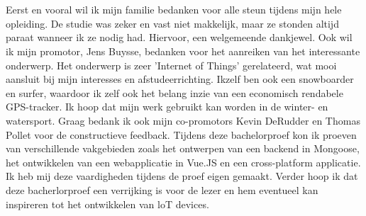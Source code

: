 
\chapter*{}
\label{ch:voorwoord}
Eerst en vooral wil ik mijn familie bedanken voor alle steun tijdens mijn hele opleiding. De studie was zeker en vast niet makkelijk, maar ze stonden altijd paraat wanneer ik ze nodig had. Hiervoor, een welgemeende dankjewel.
\newline
\newline
Ook wil ik mijn promotor, Jens Buysse, bedanken voor het aanreiken van het interessante onderwerp. Het onderwerp is zeer 'Internet of Things' gerelateerd, wat mooi aansluit bij mijn interesses en afstudeerrichting. Ikzelf ben ook een snowboarder en surfer, waardoor ik zelf ook het belang inzie van een economisch rendabele GPS-tracker. Ik hoop dat mijn werk gebruikt kan worden in de winter- en watersport.
\newline
\newline
Graag bedank ik ook mijn co-promotors Kevin DeRudder en Thomas Pollet voor de constructieve feedback.
\newline
\newline
Tijdens deze bachelorproef kon ik proeven van  verschillende vakgebieden zoals het ontwerpen van een backend in Mongoose, het ontwikkelen van een webapplicatie in Vue.JS en een cross-platform applicatie. Ik heb mij deze vaardigheden tijdens de proef eigen gemaakt. 
\newline
\newline
Verder hoop ik dat deze bacherlorproef een verrijking is voor de lezer en hem eventueel kan inspireren tot het ontwikkelen van loT devices.
